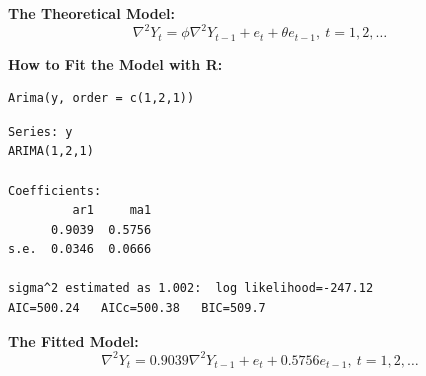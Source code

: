 \documentclass[12pt]{article}
\begin{document}
\noindent
\textbf{The Theoretical Model:} 
\[
\nabla^{2} Y_{t} = \phi \nabla^{2} Y_{t - 1} + e_{t} + \theta e_{t - 1},\ t = 1,2,\ldots
\]

\noindent
\textbf{How to Fit the Model with R:}


\begin{verbatim}
Arima(y, order = c(1,2,1))
\end{verbatim}




\begin{verbatim}
Series: y 
ARIMA(1,2,1)                    

Coefficients:
         ar1     ma1
      0.9039  0.5756
s.e.  0.0346  0.0666

sigma^2 estimated as 1.002:  log likelihood=-247.12
AIC=500.24   AICc=500.38   BIC=509.7
\end{verbatim}

\noindent
\textbf{The Fitted Model:} 
\[
\nabla^{2} Y_{t} = 0.9039 \nabla^{2} Y_{t - 1} + e_{t} + 0.5756 e_{t - 1},\ t = 1,2,\ldots
\]
\end{document}
